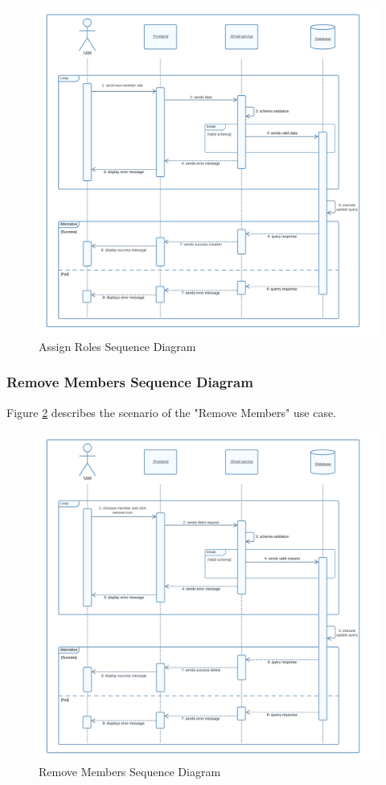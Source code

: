 \begin{figure}[ht]
	\centering
	\includegraphics[width=\linewidth]{Images/sprint2/assign roles seq diag.png}
	\caption{ Assign Roles Sequence Diagram}
	\label{fig:Sprint 2 Assign Roles Sequence Diagram}
\end{figure}

\clearpage

\subsubsection{Remove Members Sequence Diagram}

Figure \ref{fig:Sprint 2 Remove Members Sequence Diagram} describes the scenario of the "Remove Members" use case.

\begin{figure}[ht]
	\centering
	\includegraphics[width=\linewidth]{Images/sprint2/remove member seq diag.png}
	\caption{ Remove Members Sequence Diagram}
	\label{fig:Sprint 2 Remove Members Sequence Diagram}
\end{figure}
